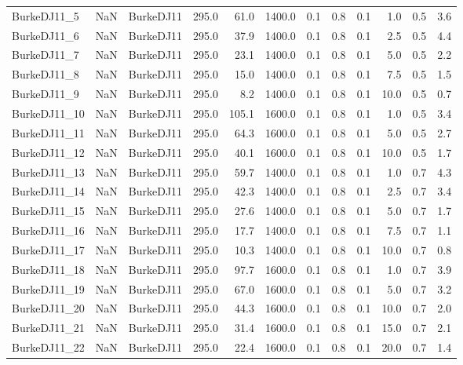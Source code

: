 \begin{tabular}{lllrrrrrrrrr}
BurkeDJ11\_5   &  NaN &   BurkeDJ11 &  295.0 &    61.0 & 1400.0 &  0.1 &  0.8 &  0.1 &  1.0 &  0.5 &    3.6 \\
BurkeDJ11\_6   &  NaN &   BurkeDJ11 &  295.0 &    37.9 & 1400.0 &  0.1 &  0.8 &  0.1 &  2.5 &  0.5 &    4.4 \\
BurkeDJ11\_7   &  NaN &   BurkeDJ11 &  295.0 &    23.1 & 1400.0 &  0.1 &  0.8 &  0.1 &  5.0 &  0.5 &    2.2 \\
BurkeDJ11\_8   &  NaN &   BurkeDJ11 &  295.0 &    15.0 & 1400.0 &  0.1 &  0.8 &  0.1 &  7.5 &  0.5 &    1.5 \\
BurkeDJ11\_9   &  NaN &   BurkeDJ11 &  295.0 &     8.2 & 1400.0 &  0.1 &  0.8 &  0.1 & 10.0 &  0.5 &    0.7 \\
BurkeDJ11\_10  &  NaN &   BurkeDJ11 &  295.0 &   105.1 & 1600.0 &  0.1 &  0.8 &  0.1 &  1.0 &  0.5 &    3.4 \\
BurkeDJ11\_11  &  NaN &   BurkeDJ11 &  295.0 &    64.3 & 1600.0 &  0.1 &  0.8 &  0.1 &  5.0 &  0.5 &    2.7 \\
BurkeDJ11\_12  &  NaN &   BurkeDJ11 &  295.0 &    40.1 & 1600.0 &  0.1 &  0.8 &  0.1 & 10.0 &  0.5 &    1.7 \\
BurkeDJ11\_13  &  NaN &   BurkeDJ11 &  295.0 &    59.7 & 1400.0 &  0.1 &  0.8 &  0.1 &  1.0 &  0.7 &    4.3 \\
BurkeDJ11\_14  &  NaN &   BurkeDJ11 &  295.0 &    42.3 & 1400.0 &  0.1 &  0.8 &  0.1 &  2.5 &  0.7 &    3.4 \\
BurkeDJ11\_15  &  NaN &   BurkeDJ11 &  295.0 &    27.6 & 1400.0 &  0.1 &  0.8 &  0.1 &  5.0 &  0.7 &    1.7 \\
BurkeDJ11\_16  &  NaN &   BurkeDJ11 &  295.0 &    17.7 & 1400.0 &  0.1 &  0.8 &  0.1 &  7.5 &  0.7 &    1.1 \\
BurkeDJ11\_17  &  NaN &   BurkeDJ11 &  295.0 &    10.3 & 1400.0 &  0.1 &  0.8 &  0.1 & 10.0 &  0.7 &    0.8 \\
BurkeDJ11\_18  &  NaN &   BurkeDJ11 &  295.0 &    97.7 & 1600.0 &  0.1 &  0.8 &  0.1 &  1.0 &  0.7 &    3.9 \\
BurkeDJ11\_19  &  NaN &   BurkeDJ11 &  295.0 &    67.0 & 1600.0 &  0.1 &  0.8 &  0.1 &  5.0 &  0.7 &    3.2 \\
BurkeDJ11\_20  &  NaN &   BurkeDJ11 &  295.0 &    44.3 & 1600.0 &  0.1 &  0.8 &  0.1 & 10.0 &  0.7 &    2.0 \\
BurkeDJ11\_21  &  NaN &   BurkeDJ11 &  295.0 &    31.4 & 1600.0 &  0.1 &  0.8 &  0.1 & 15.0 &  0.7 &    2.1 \\
BurkeDJ11\_22  &  NaN &   BurkeDJ11 &  295.0 &    22.4 & 1600.0 &  0.1 &  0.8 &  0.1 & 20.0 &  0.7 &    1.4 \\

\end{tabular}
